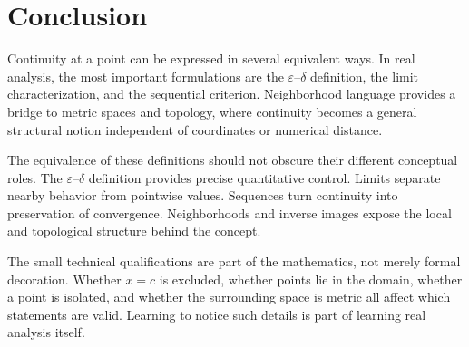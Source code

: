 \documentclass{essay}
\begin{document}
\section{Conclusion}

Continuity at a point can be expressed in several equivalent ways. In real analysis, the most important formulations are the \(\varepsilon\)--\(\delta\) definition, the limit characterization, and the sequential criterion. Neighborhood language provides a bridge to metric spaces and topology, where continuity becomes a general structural notion independent of coordinates or numerical distance.

The equivalence of these definitions should not obscure their different conceptual roles. The \(\varepsilon\)--\(\delta\) definition provides precise quantitative control. Limits separate nearby behavior from pointwise values. Sequences turn continuity into preservation of convergence. Neighborhoods and inverse images expose the local and topological structure behind the concept.

The small technical qualifications are part of the mathematics, not merely formal decoration. Whether \(x=c\) is excluded, whether points lie in the domain, whether a point is isolated, and whether the surrounding space is metric all affect which statements are valid. Learning to notice such details is part of learning real analysis itself.
\end{document}
